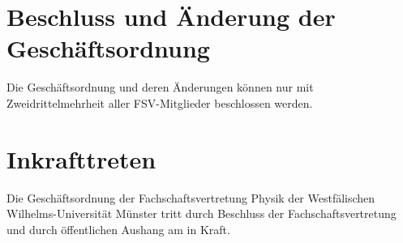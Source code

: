 \section{Beschluss und Änderung der Geschäftsordnung}
Die Geschäftsordnung und deren Änderungen können nur mit Zweidrittelmehrheit aller FSV-Mitglieder beschlossen werden.

\section{Inkrafttreten}
Die Geschäftsordnung der Fachschaftsvertretung Physik der Westfälischen Wilhelms-Universität Münster tritt durch Beschluss der Fachschaftsvertretung und durch öffentlichen Aushang am  in Kraft.


